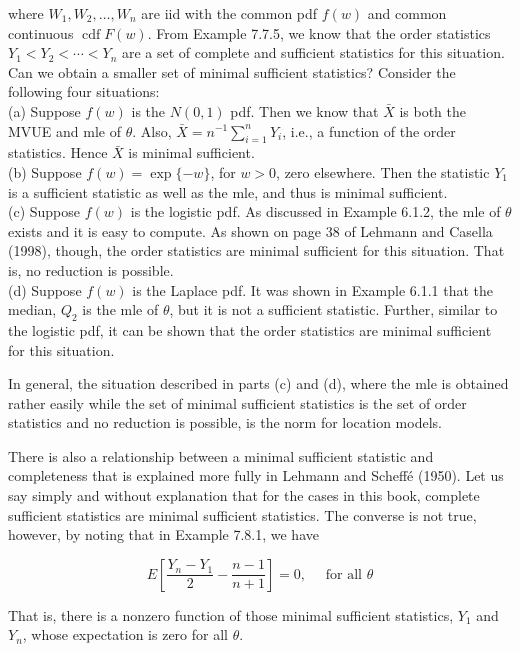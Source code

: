 where $W_{1}, W_{2}, \ldots, W_{n}$ are iid with the common pdf $f(w)$ and common continuous $\operatorname{cdf} F(w)$. From Example 7.7.5, we know that the order statistics $Y_{1}<Y_{2}<\cdots<Y_{n}$ are a set of complete and sufficient statistics for this situation. Can we obtain a smaller set of minimal sufficient statistics? Consider the following four situations:\\
(a) Suppose $f(w)$ is the $N(0,1)$ pdf. Then we know that $\bar{X}$ is both the MVUE and mle of $\theta$. Also, $\bar{X}=n^{-1} \sum_{i=1}^{n} Y_{i}$, i.e., a function of the order statistics. Hence $\bar{X}$ is minimal sufficient.\\
(b) Suppose $f(w)=\exp \{-w\}$, for $w>0$, zero elsewhere. Then the statistic $Y_{1}$ is a sufficient statistic as well as the mle, and thus is minimal sufficient.\\
(c) Suppose $f(w)$ is the logistic pdf. As discussed in Example 6.1.2, the mle of $\theta$ exists and it is easy to compute. As shown on page 38 of Lehmann and Casella (1998), though, the order statistics are minimal sufficient for this situation. That is, no reduction is possible.\\
(d) Suppose $f(w)$ is the Laplace pdf. It was shown in Example 6.1.1 that the median, $Q_{2}$ is the mle of $\theta$, but it is not a sufficient statistic. Further, similar to the logistic pdf, it can be shown that the order statistics are minimal sufficient for this situation.

In general, the situation described in parts (c) and (d), where the mle is obtained rather easily while the set of minimal sufficient statistics is the set of order statistics and no reduction is possible, is the norm for location models.

There is also a relationship between a minimal sufficient statistic and completeness that is explained more fully in Lehmann and Scheffé (1950). Let us say simply and without explanation that for the cases in this book, complete sufficient statistics are minimal sufficient statistics. The converse is not true, however, by noting that in Example 7.8.1, we have

$$
E\left[\frac{Y_{n}-Y_{1}}{2}-\frac{n-1}{n+1}\right]=0, \quad \text { for all } \theta
$$

That is, there is a nonzero function of those minimal sufficient statistics, $Y_{1}$ and $Y_{n}$, whose expectation is zero for all $\theta$.

